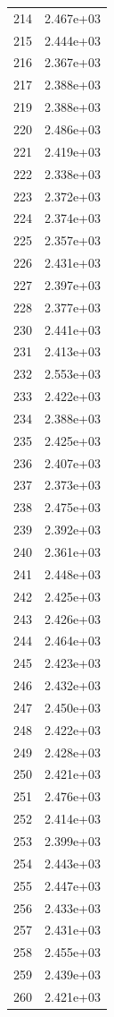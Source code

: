 \documentclass[12pt]{article}
\begin{document}
\begin{longtable}{@{}cc@{}}
214 & 2.467e+03 \\
215 & 2.444e+03 \\
216 & 2.367e+03 \\
217 & 2.388e+03 \\
219 & 2.388e+03 \\
220 & 2.486e+03 \\
221 & 2.419e+03 \\
222 & 2.338e+03 \\
223 & 2.372e+03 \\
224 & 2.374e+03 \\
225 & 2.357e+03 \\
226 & 2.431e+03 \\
227 & 2.397e+03 \\
228 & 2.377e+03 \\
230 & 2.441e+03 \\
231 & 2.413e+03 \\
232 & 2.553e+03 \\
233 & 2.422e+03 \\
234 & 2.388e+03 \\
235 & 2.425e+03 \\
236 & 2.407e+03 \\
237 & 2.373e+03 \\
238 & 2.475e+03 \\
239 & 2.392e+03 \\
240 & 2.361e+03 \\
241 & 2.448e+03 \\
242 & 2.425e+03 \\
243 & 2.426e+03 \\
244 & 2.464e+03 \\
245 & 2.423e+03 \\
246 & 2.432e+03 \\
247 & 2.450e+03 \\
248 & 2.422e+03 \\
249 & 2.428e+03 \\
250 & 2.421e+03 \\
251 & 2.476e+03 \\
252 & 2.414e+03 \\
253 & 2.399e+03 \\
254 & 2.443e+03 \\
255 & 2.447e+03 \\
256 & 2.433e+03 \\
257 & 2.431e+03 \\
258 & 2.455e+03 \\
259 & 2.439e+03 \\
260 & 2.421e+03 \\

\end{longtable}
\end{document}
